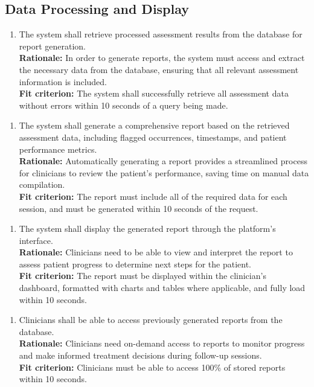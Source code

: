 \documentclass[12pt]{article}
\begin{document}
\subsection{Data Processing and Display}
\begin{enumerate}[{FR-DPD}1. ]
  \item The system shall retrieve processed assessment results from the database for report generation.\\
  \textbf{Rationale: }In order to generate reports, the system must access and extract the necessary data from the database, ensuring that all relevant assessment information is included.\\
  \textbf{Fit criterion: }The system shall successfully retrieve all assessment data without errors within 10 seconds of a query being made.
\end{enumerate}
\begin{enumerate}[{FR-DPD}2. ]
  \item The system shall generate a comprehensive report based on the retrieved assessment data, including flagged occurrences, timestamps, and patient performance metrics.\\
  \textbf{Rationale: }Automatically generating a report provides a streamlined process for clinicians to review the patient’s performance, saving time on manual data compilation.\\
  \textbf{Fit criterion: }The report must include all of the required data for each session, and must be generated within 10 seconds of the request.
\end{enumerate}
\begin{enumerate}[{FR-DPD}3. ]
  \item The system shall display the generated report through the platform’s interface.\\
  \textbf{Rationale: }Clinicians need to be able to view and interpret the report to assess patient progress to determine next steps for the patient.\\
  \textbf{Fit criterion: }The report must be displayed within the clinician's dashboard, formatted with charts and tables where applicable, and fully load within 10 seconds.
\end{enumerate}
\begin{enumerate}[{FR-DPD}4. ]
  \item Clinicians shall be able to access previously generated reports from the database.\\
  \textbf{Rationale: }Clinicians need on-demand access to reports to monitor progress and make informed treatment decisions during follow-up sessions.\\
  \textbf{Fit criterion: }Clinicians must be able to access 100\% of stored reports within 10 seconds.  
\end{enumerate}
\end{document}

